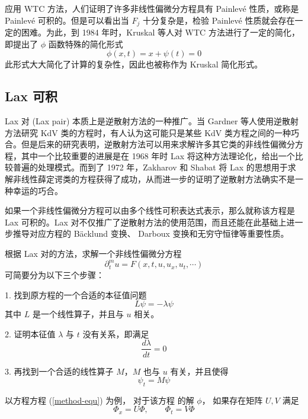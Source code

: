 应用 WTC 方法，人们证明了许多非线性偏微分方程具有 Painlev\'{e} 性质，或称是  Painlev\'{e} 可积的。但是可以看出当 $F_j$ 十分复杂是，检验 Painlev\'{e} 性质就会存在一定的困难。为此，到 1984 年时，Kruskal 等人对 WTC 方法进行了一定的简化，即提出了 $\phi$ 函数特殊的简化形式
\begin{equation}
  \phi(x,t) = x + \psi(t) = 0
\end{equation}
此形式大大简化了计算的复杂性，因此也被称作为 Kruskal 简化形式。

\subsection{Lax 可积}
Lax 对 (Lax pair) 本质上是逆散射方法的一种推广。当 Gardner 等人使用逆散射方法研究 KdV 类的方程时，有人认为这可能只是某些 KdV 类方程之间的一种巧合。但是后来的研究表明，逆散射方法可以用来求解许多其它类的非线性偏微分方程，其中一个比较重要的进展是在 1968 年时 Lax 将这种方法理论化，给出一个比较普遍的处理模式。而到了 1972 年，Zakharov 和 Shabat 将 Lax 的思想用于求解非线性薛定谔类的方程获得了成功，从而进一步的证明了逆散射方法确实不是一种幸运的巧合。

如果一个非线性偏微分方程可以由多个线性可积表达式表示，那么就称该方程是 Lax 可积的。Lax 对不仅推广了逆散射方法的使用范围，而且还能在此基础上进一步推导对应方程的 B\"{a}cklund 变换、 Darboux 变换和无穷守恒律等重要性质。


根据 Lax 对的方法，求解一个非线性偏微分方程
\begin{equation}
  \partial^m_t u = F(x, t, u, u_x, u_t, \cdots)
\end{equation}
可简要分为以下三个步骤：

1. 找到原方程的一个合适的本征值问题
\begin{equation}
  L\psi = -\lambda \psi
\end{equation}
其中 $L$ 是一个线性算子，并且与 $u$ 相关。

2. 证明本征值 $\lambda$ 与 $t$ 没有关系，即满足
\begin{equation}
  \frac{d\lambda}{dt} = 0
\end{equation}

3. 再找到一个合适的线性算子 $M$，$M$ 也与 $u$ 有关，并且使得
\begin{equation}
  \psi_t = M\psi
\end{equation}

以方程方程 (\ref{method-equ}) 为例， 对于该方程 的解 $\phi$， 如果存在矩阵 $U, V$ 满足
\begin{equation}
  \Phi_x=U \Phi, \qquad \Phi_t=V \Phi \label{method-Lax}
\end{equation}

